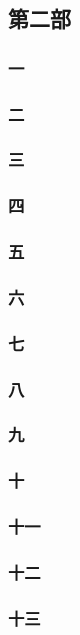 \subsection*{第二部}




\subsubsection*{一}
\subsubsection*{二}
\subsubsection*{三}
\subsubsection*{四}
\subsubsection*{五}
\subsubsection*{六}
\subsubsection*{七}
\subsubsection*{八}
\subsubsection*{九}
\subsubsection*{十}
\subsubsection*{十一}
\subsubsection*{十二}
\subsubsection*{十三}
